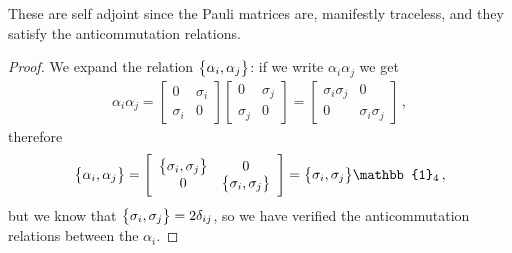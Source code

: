 \documentclass[main.tex]{subfiles}
\begin{document}
These are self adjoint since the Pauli matrices are, manifestly traceless, and they satisfy the anticommutation relations. 

\begin{proof}
We expand the relation \(\qty{\alpha_{i}, \alpha_{j}}\): if we write \(\alpha_{i} \alpha_{j}\) we get 
%
\begin{align}
\alpha_{i} \alpha_{j} = 
\left[\begin{array}{cc}
0 & \sigma_{i} \\ 
\sigma_{i} & 0
\end{array}\right]
\left[\begin{array}{cc}
0 & \sigma_{j} \\ 
\sigma_{j} & 0
\end{array}\right]
= \left[\begin{array}{cc}
\sigma_{i} \sigma_{j} & 0 \\ 
0 & \sigma_{i} \sigma_{j}
\end{array}\right]
\,,
\end{align}
%
therefore 
%
\begin{align}
\qty{\alpha_{i}, \alpha_{j}} = \left[\begin{array}{cc}
\qty{\sigma_{i}, \sigma_{j}} & 0 \\ 
0 & \qty{\sigma_{i}, \sigma_{j}}
\end{array}\right]
= \qty{\sigma_{i}, \sigma_{j}} \mathbb{1}_{4}
\,,
\end{align}
%
but we know that \(\qty{\sigma_{i}, \sigma_{j}} = 2 \delta_{ij}\), so we have verified the anticommutation relations between the \(\alpha_{i}\). 


\end{proof}
\end{document}
